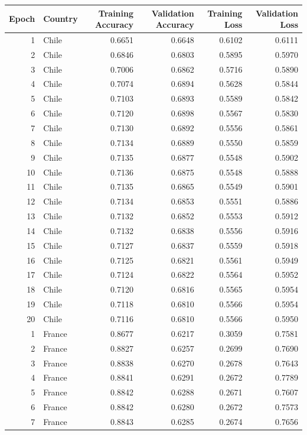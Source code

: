 \begin{tabular}{rlrrrr}
\toprule
Epoch & Country & Training Accuracy & Validation Accuracy & Training Loss & Validation Loss \\
\midrule
1 & Chile & 0.6651 & 0.6648 & 0.6102 & 0.6111 \\
2 & Chile & 0.6846 & 0.6803 & 0.5895 & 0.5970 \\
3 & Chile & 0.7006 & 0.6862 & 0.5716 & 0.5890 \\
4 & Chile & 0.7074 & 0.6894 & 0.5628 & 0.5844 \\
5 & Chile & 0.7103 & 0.6893 & 0.5589 & 0.5842 \\
6 & Chile & 0.7120 & 0.6898 & 0.5567 & 0.5830 \\
7 & Chile & 0.7130 & 0.6892 & 0.5556 & 0.5861 \\
8 & Chile & 0.7134 & 0.6889 & 0.5550 & 0.5859 \\
9 & Chile & 0.7135 & 0.6877 & 0.5548 & 0.5902 \\
10 & Chile & 0.7136 & 0.6875 & 0.5548 & 0.5888 \\
11 & Chile & 0.7135 & 0.6865 & 0.5549 & 0.5901 \\
12 & Chile & 0.7134 & 0.6853 & 0.5551 & 0.5886 \\
13 & Chile & 0.7132 & 0.6852 & 0.5553 & 0.5912 \\
14 & Chile & 0.7132 & 0.6838 & 0.5556 & 0.5916 \\
15 & Chile & 0.7127 & 0.6837 & 0.5559 & 0.5918 \\
16 & Chile & 0.7125 & 0.6821 & 0.5561 & 0.5949 \\
17 & Chile & 0.7124 & 0.6822 & 0.5564 & 0.5952 \\
18 & Chile & 0.7120 & 0.6816 & 0.5565 & 0.5954 \\
19 & Chile & 0.7118 & 0.6810 & 0.5566 & 0.5954 \\
20 & Chile & 0.7116 & 0.6810 & 0.5566 & 0.5950 \\
1 & France & 0.8677 & 0.6217 & 0.3059 & 0.7581 \\
2 & France & 0.8827 & 0.6257 & 0.2699 & 0.7690 \\
3 & France & 0.8838 & 0.6270 & 0.2678 & 0.7643 \\
4 & France & 0.8841 & 0.6291 & 0.2672 & 0.7789 \\
5 & France & 0.8842 & 0.6288 & 0.2671 & 0.7607 \\
6 & France & 0.8842 & 0.6280 & 0.2672 & 0.7573 \\
7 & France & 0.8843 & 0.6285 & 0.2674 & 0.7656 \\

\end{tabular}
